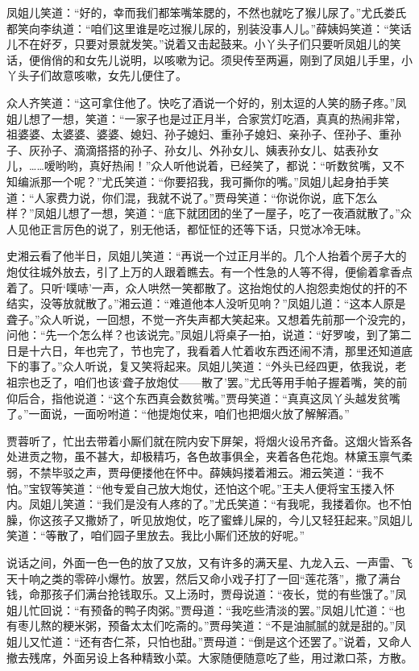 凤姐儿笑道：“好的，幸而我们都笨嘴笨腮的，不然也就吃了猴儿尿了。”尤氏娄氏都笑向李纨道：“咱们这里谁是吃过猴儿尿的，别装没事人儿。”薛姨妈笑道：“笑话儿不在好歹，只要对景就发笑。”说着又击起鼓来。小丫头子们只要听凤姐儿的笑话，便俏俏的和女先儿说明，以咳嗽为记。须臾传至两遍，刚到了凤姐儿手里，小丫头子们故意咳嗽，女先儿便住了。

众人齐笑道：“这可拿住他了。快吃了酒说一个好的，别太逗的人笑的肠子疼。”凤姐儿想了一想，笑道：“一家子也是过正月半，合家赏灯吃酒，真真的热闹非常，祖婆婆、太婆婆、婆婆、媳妇、孙子媳妇、重孙子媳妇、亲孙子、侄孙子、重孙子、灰孙子、滴滴搭搭的孙子、孙女儿、外孙女儿、姨表孙女儿、姑表孙女儿，\ldots{}\ldots{}嗳哟哟，真好热闹！”众人听他说着，已经笑了，都说：“听数贫嘴，又不知编派那一个呢？”尤氏笑道：“你要招我，我可撕你的嘴。”凤姐儿起身拍手笑道：“人家费力说，你们混，我就不说了。”贾母笑道：“你说你说，底下怎么样？”凤姐儿想了一想，笑道：“底下就团团的坐了一屋子，吃了一夜酒就散了。”众人见他正言厉色的说了，别无他话，都怔怔的还等下话，只觉冰冷无味。

史湘云看了他半日，凤姐儿笑道：“再说一个过正月半的。几个人抬着个房子大的炮仗往城外放去，引了上万的人跟着瞧去。有一个性急的人等不得，便偷着拿香点着了。只听‘噗哧’一声，众人哄然一笑都散了。这抬炮仗的人抱怨卖炮仗的扞的不结实，没等放就散了。”湘云道：“难道他本人没听见响？”凤姐儿道：“这本人原是聋子。”众人听说，一回想，不觉一齐失声都大笑起来。又想着先前那一个没完的，问他：“先一个怎么样？也该说完。”凤姐儿将桌子一拍，说道：“好罗唆，到了第二日是十六日，年也完了，节也完了，我看着人忙着收东西还闹不清，那里还知道底下的事了。”众人听说，复又笑将起来。凤姐儿笑道：“外头已经四更，依我说，老祖宗也乏了，咱们也该‘聋子放炮仗------散了’罢。”尤氏等用手帕子握着嘴，笑的前仰后合，指他说道：“这个东西真会数贫嘴。”贾母笑道：“真真这凤丫头越发贫嘴了。”一面说，一面吩咐道：“他提炮仗来，咱们也把烟火放了解解酒。”

贾蓉听了，忙出去带着小厮们就在院内安下屏架，将烟火设吊齐备。这烟火皆系各处进贡之物，虽不甚大，却极精巧，各色故事俱全，夹着各色花炮。林黛玉禀气柔弱，不禁毕驳之声，贾母便搂他在怀中。薛姨妈搂着湘云。湘云笑道：“我不怕。”宝钗等笑道：“他专爱自己放大炮仗，还怕这个呢。”王夫人便将宝玉搂入怀内。凤姐儿笑道：“我们是没有人疼的了。”尤氏笑道：“有我呢，我搂着你。也不怕臊，你这孩子又撒娇了，听见放炮仗，吃了蜜蜂儿屎的，今儿又轻狂起来。”凤姐儿笑道：“等散了，咱们园子里放去。我比小厮们还放的好呢。”

说话之间，外面一色一色的放了又放，又有许多的满天星、九龙入云、一声雷、飞天十响之类的零碎小爆竹。放罢，然后又命小戏子打了一回“莲花落”，撒了满台钱，命那孩子们满台抢钱取乐。又上汤时，贾母说道：“夜长，觉的有些饿了。”凤姐儿忙回说：“有预备的鸭子肉粥。”贾母道：“我吃些清淡的罢。”凤姐儿忙道：“也有枣儿熬的粳米粥，预备太太们吃斋的。”贾母笑道：“不是油腻腻的就是甜的。”凤姐儿又忙道：“还有杏仁茶，只怕也甜。”贾母道：“倒是这个还罢了。”说着，又命人撤去残席，外面另设上各种精致小菜。大家随便随意吃了些，用过漱口茶，方散。


